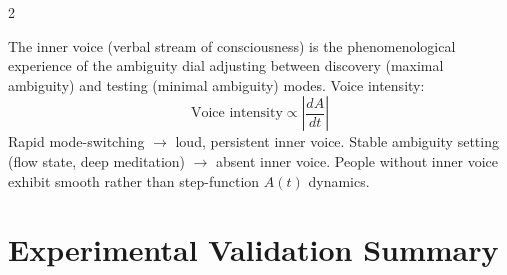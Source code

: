 \begin{multicols}{2}
\begin{theorem}
\label{thm:inner_voice}
The inner voice (verbal stream of consciousness) is the phenomenological
experience of the ambiguity dial adjusting between discovery (maximal
ambiguity) and testing (minimal ambiguity) modes.  Voice intensity:
\begin{equation}
\text{Voice intensity} \propto \left|\frac{dA}{dt}\right|
\label{eq:voice_intensity}
\end{equation}
Rapid mode-switching $\to$ loud, persistent inner voice.
Stable ambiguity setting (flow state, deep meditation) $\to$ absent inner
voice.  People without inner voice exhibit smooth rather than step-function
$A(t)$ dynamics.
\end{theorem}

\end{multicols}

\section{Experimental Validation Summary}
\label{sec:cc_validation}

